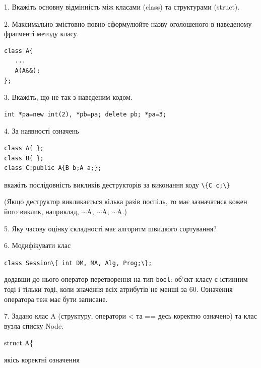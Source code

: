 \documentclass[12pt, ukrainian]{article}
\def\code#1{\Verb!#1!}
\begin{document}
{%
1. Вкажіть основну відмінність між класами (class) та структурами (struct).%
\par
\vspace{2mm}
2. Максимально змістовно повно сформулюйте назву оголошеного в наведеному фрагменті методу класу.
\vspace{-3mm}
\begin{verbatim}class A{
   ...
   A(A&&);
};\end{verbatim}
\vspace{-3mm}
\par
\vspace{2mm}
3. Вкажіть, що не так з наведеним кодом.
\vspace{-3mm}
\begin{verbatim}int *pa=new int(2), *pb=pa; delete pb; *pa=3;\end{verbatim}
\vspace{-3mm}
\par
\vspace{2mm}
4. За наявності означень
\vspace{-3mm}
\begin{verbatim}
class A{ };
class B{ };
class C:public A{B b;A a;};\end{verbatim}
\vspace{-3mm}
вкажіть послідовність викликів деструкторів за виконання коду \code{\{C c;\}} 

(Якщо деструктор викликається кілька разів поспіль, то має зазначатися кожен його виклик, наприклад, $\sim$A, $\sim$A, $\sim$A.)

\vspace{2mm}
5. Яку часову оцінку складності має алгоритм швидкого сортування?
\par
\vspace{2mm}
6. Модифікувати клас 

\qquad\code{class Session\{ int DM, MA, Alg, Prog;\};} 


додавши до нього оператор перетворення на тип \code{bool}: об'єкт класу є істинним тоді і тільки тоді, коли значення всіх атрибутів не менші за 60. Означення оператора теж має бути записане.%
\par
\vspace{2mm}
7. 
Задано клас A (структуру, оператори < та == десь коректно означено) та клас вузла списку Node.

struct A\{

\quad  якісь коректні означення 

}
\end{document}
